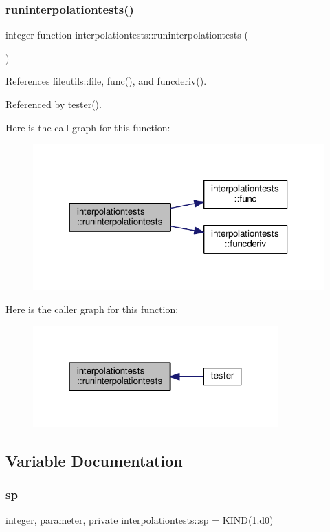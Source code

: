 \subsubsection{\texorpdfstring{runinterpolationtests()}{runinterpolationtests()}}
{\footnotesize\ttfamily integer function interpolationtests\+::runinterpolationtests (\begin{DoxyParamCaption}{ }\end{DoxyParamCaption})}



References fileutils\+::file, func(), and funcderiv().



Referenced by tester().

Here is the call graph for this function\+:
\nopagebreak
\begin{figure}[H]
\begin{center}
\leavevmode
\includegraphics[width=318pt]{namespaceinterpolationtests_a4884e2815dc1d6e85e77392363e72b83_cgraph}
\end{center}
\end{figure}
Here is the caller graph for this function\+:
\nopagebreak
\begin{figure}[H]
\begin{center}
\leavevmode
\includegraphics[width=268pt]{namespaceinterpolationtests_a4884e2815dc1d6e85e77392363e72b83_icgraph}
\end{center}
\end{figure}


\subsection{Variable Documentation}
\mbox{\label{namespaceinterpolationtests_a4e83007da3730863a762c2e30c3d336f}} 
\subsubsection{\texorpdfstring{sp}{sp}}
{\footnotesize\ttfamily integer, parameter, private interpolationtests\+::sp = K\+I\+ND(1.d0)\hspace{0.3cm}{\ttfamily [private]}}

